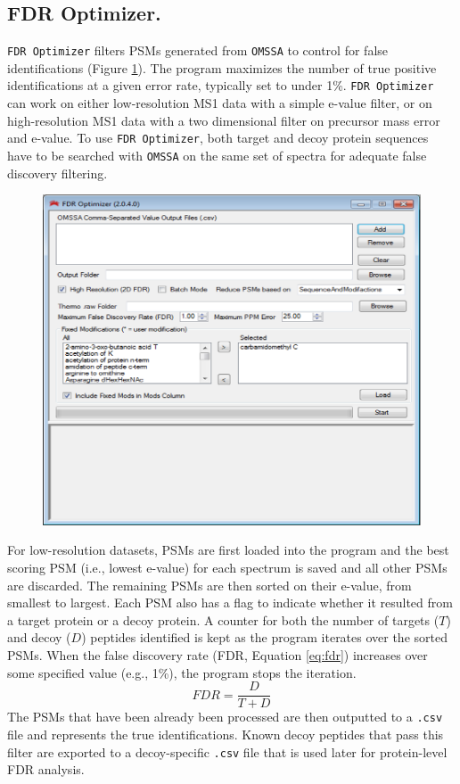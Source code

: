 \subsection*{FDR Optimizer.}
\texttt{FDR Optimizer} filters PSMs generated from \texttt{OMSSA} to control for false identifications (Figure \ref{fig:fdr}). The program maximizes the number of true positive identifications at a given error rate, typically set to under 1\%. \texttt{FDR Optimizer} can work on either low-resolution MS1 data with a simple e-value filter, or on high-resolution MS1 data with a two dimensional filter on precursor mass error and e-value. To use \texttt{FDR Optimizer}, both target and decoy protein sequences have to be searched with \texttt{OMSSA} on the same set of spectra for adequate false discovery filtering. 
\begin{figure}[p]
	\centering
	\includegraphics[width=\columnwidth]{csmsl/fdr.png}
	\label{fig:fdr}
\end{figure}

For low-resolution datasets, PSMs are first loaded into the program and the best scoring PSM (i.e., lowest e-value) for each spectrum is saved and all other PSMs are discarded. The remaining PSMs are then sorted on their e-value, from smallest to largest. Each PSM also has a flag to indicate whether it resulted from a target protein or a decoy protein. A counter for both the number of targets ($T$) and decoy ($D$) peptides identified is kept as the program iterates over the sorted PSMs. When the false discovery rate (FDR, Equation \ref{eq:fdr}) increases over some specified value (e.g., 1\%), the program stops the iteration.
\begin{equation}
FDR =\frac{D}{T + D}
\label{eq:fdr}
\end{equation}
The PSMs that have been already been processed are then outputted to a \texttt{.csv} file and represents the true identifications. Known decoy peptides that pass this filter are exported to a decoy-specific \texttt{.csv} file that is used later for protein-level FDR analysis.

